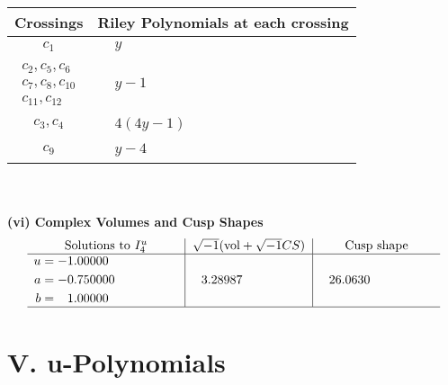 \documentclass[1p]{elsarticle_modified}
\theoremstyle{definition}
\newcommand{\I}{\sqrt{-1}}
\begin{document}
\begin{tabular}{m{50pt}|m{274pt}}
Crossings & \hspace{64pt}Riley Polynomials at each crossing \\
\hline $$\begin{aligned}c_{1}\end{aligned}$$&$\begin{aligned}
&y
\end{aligned}$\\
\hline $$\begin{aligned}c_{2},c_{5},c_{6}\\c_{7},c_{8},c_{10}\\c_{11},c_{12}\end{aligned}$$&$\begin{aligned}
&y-1
\end{aligned}$\\
\hline $$\begin{aligned}c_{3},c_{4}\end{aligned}$$&$\begin{aligned}
&4(4 y-1)
\end{aligned}$\\
\hline $$\begin{aligned}c_{9}\end{aligned}$$&$\begin{aligned}
&y-4
\end{aligned}$\\
\hline
\end{tabular}\\~\\
\newpage\flushleft \textbf{(vi) Complex Volumes and Cusp Shapes}
$$\begin{array}{c|c|c}  
\text{Solutions to }I^u_{4}& \I (\text{vol} + \sqrt{-1}CS) & \text{Cusp shape}\\
 \hline 
\begin{aligned}
u &= -1.00000\phantom{ +0.000000I} \\
a &= -0.750000\phantom{ +0.000000I} \\
b &= \phantom{-}1.00000\phantom{ +0.000000I}\end{aligned}
 & \phantom{-}3.28987\phantom{ +0.000000I} & \phantom{-}26.0630\phantom{ +0.000000I}\\
 \hline 
 \end{array}$$\newpage
\newpage\renewcommand{\arraystretch}{1}
\centering \section*{ V. u-Polynomials}
\end{document}
